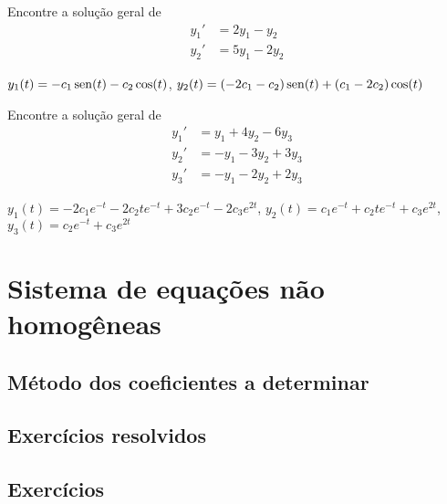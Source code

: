 \begin{exer}
  Encontre a solução geral de
  \begin{align}
    y_1' &= 2y_1 - y_2 \\
    y_2' &= 5y_1 - 2y_2
  \end{align}
\end{exer}
\begin{resp}
  $y_1(t) = -c_1\operatorname{sen}(t) - c_2\cos(t)$, $y_2(t) = (-2c_1-c_2)\operatorname{sen}(t) + (c_1 -2c_2)\cos(t)$
\end{resp}

\begin{exer}
  Encontre a solução geral de
  \begin{align}
    y_1' &= y_1 + 4y_2 - 6y_3 \\
    y_2' &= -y_1 -3y_2 + 3y_3 \\
    y_3' &= -y_1 -2y_2 + 2y_3
  \end{align}
\end{exer}
\begin{resp}
  $y_1(t) = -2c_1e^{-t}-2c_2te^{-t}+3c_2e^{-t}-2c_3e^{2t}$, $y_2(t)=c_1e^{-t}+c_2te^{-t}+c_3e^{2t}$, $y_3(t) = c_2e^{-t}+c_3e^{2t}$
\end{resp}


\section{Sistema de equações não homogêneas}\label{cap_edosis1_sec_eqnh}

\emconstrucao

\subsection{Método dos coeficientes a determinar}

\emconstrucao

\subsection*{Exercícios resolvidos}

\emconstrucao

\subsection*{Exercícios}

\emconstrucao
